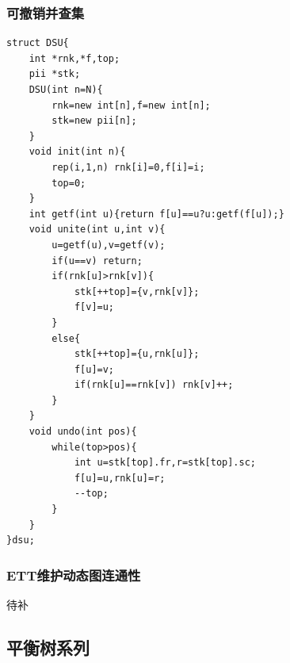 \documentclass[a4]{ctexart}
\begin{document}
\subsubsection{可撤销并查集}
\begin{lstlisting}
struct DSU{
	int *rnk,*f,top;
	pii *stk;
	DSU(int n=N){
		rnk=new int[n],f=new int[n];
		stk=new pii[n];
	}
	void init(int n){
	    rep(i,1,n) rnk[i]=0,f[i]=i;
	    top=0;
	}
	int getf(int u){return f[u]==u?u:getf(f[u]);}
	void unite(int u,int v){
	    u=getf(u),v=getf(v);
	    if(u==v) return;
	    if(rnk[u]>rnk[v]){
	        stk[++top]={v,rnk[v]};
	        f[v]=u;
	    }
	    else{
	        stk[++top]={u,rnk[u]};
	        f[u]=v;
	        if(rnk[u]==rnk[v]) rnk[v]++;
	    }
	}
	void undo(int pos){
		while(top>pos){
		    int u=stk[top].fr,r=stk[top].sc;
		    f[u]=u,rnk[u]=r;
		    --top;
		}
	}
}dsu;
\end{lstlisting}

\subsubsection{ETT维护动态图连通性}
待补
\subsection{平衡树系列}
\end{document}
